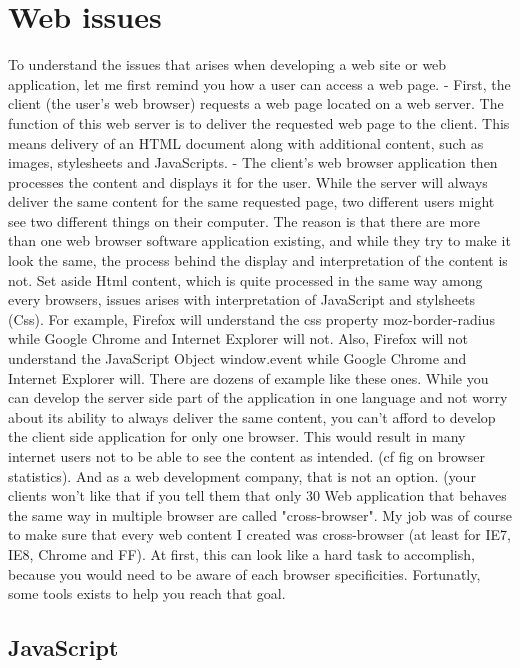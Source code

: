 \section{Web issues}

 
To understand the issues that arises when developing a web site or web application, let me first remind you how a user can access a web page. 
- First, the client (the user's web browser) requests a web page located on a web server. The function of this web server is to deliver the requested web page to the client. This means delivery of an HTML document along with additional content, 
such as images, stylesheets and JavaScripts. 
- The client's web browser application then processes the content and displays it for the user. 
While the server will always deliver the same content for the same requested page, two different users might see two different things on their computer. 
The reason is that there are more than one web browser software application existing, and while they try to make it look the same, the process behind the display and interpretation of the content is not. Set aside Html content, which is quite processed in the same way among every browsers, issues arises with interpretation of
JavaScript and stylsheets (Css). For example, Firefox will understand the css property moz-border-radius while Google Chrome and Internet Explorer will not. Also, Firefox will not understand the JavaScript Object window.event while Google Chrome and Internet Explorer will. There are dozens of example like these ones.
While you can develop the server side part of the application in one language and not worry about its ability to always deliver the same content, you can't afford to develop the client side application for only one browser. This would result in many internet users not to be able to see the content as intended. (cf fig on browser statistics).
And as a web development company, that is not an option. (your clients won't like that if you tell them that only 30 
Web application that behaves the same way in multiple browser are called "cross-browser". 
My job was of course to make sure that every web content I created was cross-browser (at least for IE7, IE8, Chrome and FF).
At first, this can look like a hard task to accomplish, because you would need to be aware of each browser specificities. Fortunatly, some tools exists to help you reach that goal.

\subsection{JavaScript}

